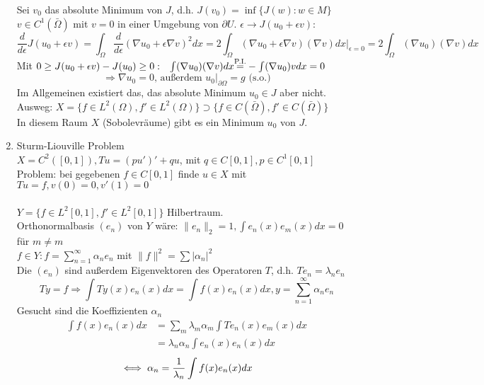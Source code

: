 \begin{enumerate}
	Sei $v_{0}$ das absolute Minimum von $J$, d.h. $J(v_{0}) = \inf \{ J(w): w \in M \}$ \\
	$v \in C^{1}(\bar \Omega)$ mit $v = 0$ in einer Umgebung von $\partial U$. $\epsilon \rightarrow J(u_{0} + \epsilon v)$:
	\[ \frac{d}{d\epsilon} J(u_{0} + \epsilon v) = \int_{\Omega} \frac{d}{d\epsilon} (\nabla u_{0} + \epsilon \nabla v)^{2} dx = 2 \int_{\Omega} (\nabla u_{0} + \epsilon \nabla v)(\nabla v) dx|_{\epsilon = 0} = 2 \int_\Omega (\nabla u_{0}) (\nabla v) dx \]
	Mit $0 \geq J(u_{0} + \epsilon v)- J(u_{0}) \geq 0: \hspace{0.25cm} \int (\nabla u_{0})(\nabla v) dx \overset{\text{P.I.}}{{=}} - \int (\nabla u_{0})v dx = 0$ \\
	\[ \Rightarrow \nabla u_{0} = 0 \text{, au{\ss}erdem } u_{0 }|_{\partial \Omega} = g \text{ (s.o.)} \]
	Im Allgemeinen existiert das, das absolute Minimum $u_{0} \in J$ aber nicht. \\
	Ausweg: $X = \{ f \in L^{2}(\Omega), f' \in L^{2}(\Omega) \} \supset \{f \in C(\bar \Omega), f' \in C(\bar \Omega) \} $	\\
	In diesem Raum $X$ (Sobolevräume) gibt es ein Minimum $u_{0}$ von $J$. \\
	\item Sturm-Liouville Problem  \\
	$X = C^{2}([0, 1]), Tu = (pu')' + qu$, mit $q \in C[0, 1], p \in C^{1}[0, 1]$ \\ 
	Problem: bei gegebenen $f \in C[0, 1]$ finde $u \in X$ mit $Tu = f, v(0) = 0, v'(1) = 0$ \\ \\
	$Y = \{ f \in L^{2}[0, 1], f' \in L^{2}[0, 1] \}$ Hilbertraum. \\
	Orthonormalbasis $(e_{n})$ von $Y$ wäre: $\| e_{n} \|_{2} = 1, \int e_{n}(x) e_{m}(x) dx = 0$ für $m \neq m$ \\
	$f \in Y: f = \sum_{n = 1}^{\infty} \alpha_{n} e_{n}$ mit $\| f \|^2 = \sum | \alpha_{n} |^2$ \\
	Die $(e_{n})$ sind au{\ss}erdem Eigenvektoren des Operatoren $T$, d.h. $Te_{n} = \lambda_{n} e_{n}$ \\
	\[ Ty = f \Rightarrow \int Ty(x) e_{n}(x) dx = \int f(x) e_{n}(x) dx, y = \sum_{n = 1}^{\infty} \alpha_{n} e_{n} \]
	Gesucht sind die Koeffizienten $\alpha_{n}$
	\begin{align*}
		\int f(x) e_{n}(x) dx & = \sum_{m} \lambda_{m} \alpha_{m} \int T e_{n}(x) e_{m}(x) dx \\
							  & =  \lambda_{n} \alpha_{n} \int e_{n}(x) e_{n}(x) dx
	\end{align*}
	\[ \iff \alpha_{n} = \frac{1}{\lambda_n} \int f(x) e_{n}(x) dx \]
\end{enumerate}



\newpage